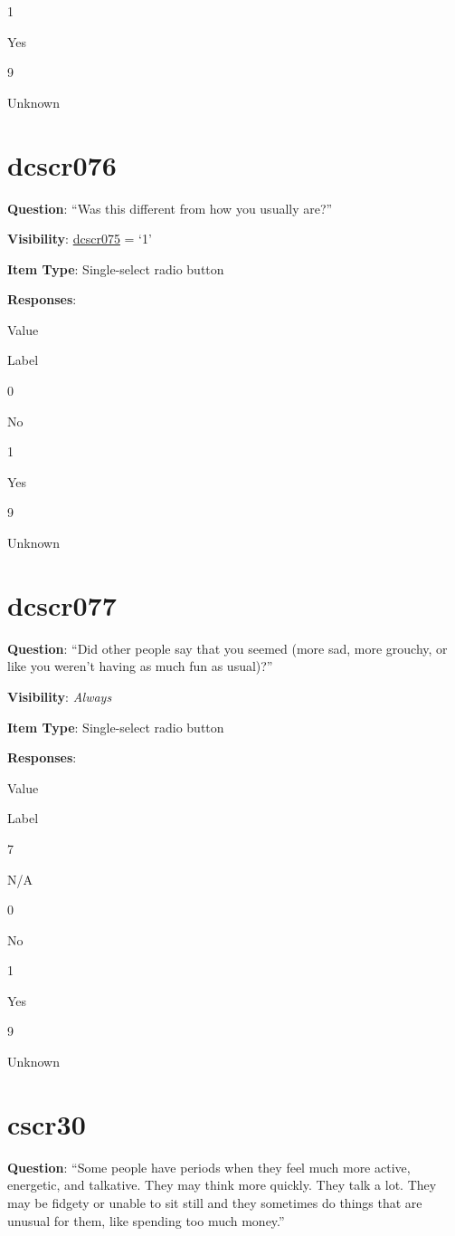 \documentclass[]{book}
\begin{document}
1

Yes

9

Unknown

\hypertarget{dcscr076}{%
\section{dcscr076}\label{dcscr076}}

\textbf{Question}: ``Was this different from how you usually are?''

\textbf{Visibility}: \protect\hyperlink{dcscr075}{dcscr075} = `1'

\textbf{Item Type}: Single-select radio button

\textbf{Responses}:

Value

Label

0

No

1

Yes

9

Unknown

\hypertarget{dcscr077}{%
\section{dcscr077}\label{dcscr077}}

\textbf{Question}: ``Did other people say that you seemed (more sad, more grouchy, or like you weren't having as much fun as usual)?''

\textbf{Visibility}: \emph{Always}

\textbf{Item Type}: Single-select radio button

\textbf{Responses}:

Value

Label

7

N/A

0

No

1

Yes

9

Unknown

\hypertarget{cscr30}{%
\section{cscr30}\label{cscr30}}

\textbf{Question}: ``Some people have periods when they feel much more active, energetic, and talkative. They may think more quickly. They talk a lot. They may be fidgety or unable to sit still and they sometimes do things that are unusual for them, like spending too much money.''
\end{document}
